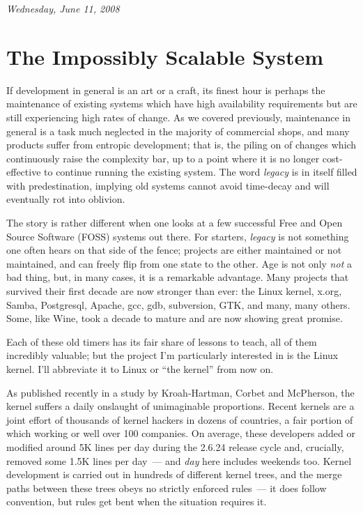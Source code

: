 \documentclass{memoir}
\begin{document}
\begin{flushright}
  \emph{Wednesday, June 11, 2008}
\end{flushright}


\section{The Impossibly Scalable System}

If development in general is an art or a craft, its finest hour is
perhaps the maintenance of existing systems which have high
availability requirements but are still experiencing high rates of
change. As we covered previously, maintenance in general is a task
much neglected in the majority of commercial shops, and many products
suffer from entropic development; that is, the piling on of changes
which continuously raise the complexity bar, up to a point where it is
no longer cost-effective to continue running the existing system. The
word \emph{legacy} is in itself filled with predestination, implying
old systems cannot avoid time-decay and will eventually rot into
oblivion.

The story is rather different when one looks at a few successful Free
and Open Source Software (FOSS) systems out there. For starters,
\emph{legacy} is not something one often hears on that side of the
fence; projects are either maintained or not maintained, and can
freely flip from one state to the other. Age is not only \emph{not} a
bad thing, but, in many cases, it is a remarkable advantage. Many
projects that survived their first decade are now stronger than ever:
the Linux kernel, x.org, Samba, Postgresql, Apache, gcc, gdb,
subversion, GTK, and many, many others. Some, like Wine, took a decade
to mature and are now showing great promise.

Each of these old timers has its fair share of lessons to teach, all
of them incredibly valuable; but the project I'm particularly
interested in is the Linux kernel. I'll abbreviate it to Linux or ``the
kernel'' from now on.

As published recently in a study by Kroah-Hartman, Corbet and
McPherson, the kernel suffers a daily onslaught of unimaginable
proportions. Recent kernels are a joint effort of thousands of kernel
hackers in dozens of countries, a fair portion of which working or
well over 100 companies. On average, these developers added or
modified around 5K lines per day during the 2.6.24 release cycle and,
crucially, removed some 1.5K lines per day~--- and \emph{day} here
includes weekends too. Kernel development is carried out in hundreds
of different kernel trees, and the merge paths between these trees
obeys no strictly enforced rules~--- it does follow convention, but
rules get bent when the situation requires it.
\end{document}
